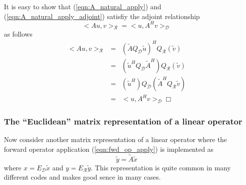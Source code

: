 It is easy to show that (\ref{eqn:A_natural_apply}) and
(\ref{eqn:A_natural_apply_adjoint}) satisfiy the adjoint relationship
%
\begin{equation}
<A u, v>_{\mathcal{R}} = <u,A^H v>_{\mathcal{D}}
\label{eqn:adjoint_relation}
\end{equation}
%
as follows
%
\begin{eqnarray}
<A u, v>_{\mathcal{R}}
& = & (\tilde{A} Q_{\mathcal{D}} \tilde{u} )^H Q_{\mathcal{R}} (\tilde{v}) \nonumber \\
& = & ( \tilde{u}^H Q_{\mathcal{D}} \tilde{A}^H ) Q_{\mathcal{R}} (\tilde{v}) \nonumber \\
& = & (\tilde{u}^H ) Q_{\mathcal{D}} ( \tilde{A}^H Q_{\mathcal{R}} \tilde{v}) \nonumber \\
& = & <u, A^H v>_{\mathcal{D}} \Box
\label{eqn:adjoint_relation_proved}
\end{eqnarray}
%

\subsubsection{The ``Euclidean'' matrix representation of a linear operator}
\label{sec:euclidean_matrix_rep_linear_operator}

Now consider another matrix representation of a linear operator where the
forward operator application (\ref{eqn:fwd_op_apply}) is implemented as
%
\begin{equation}
\tilde{y} = \tilde{A} \tilde{x}
\label{eqn:euclidean_forward_op_apply}
\end{equation}
%
where $x = E_{\mathcal{D}}\tilde{x}$ and $y = E_{\mathcal{R}}\tilde{y}$.  This
representation is quite common in many different codes and makes good sence in
many cases.

